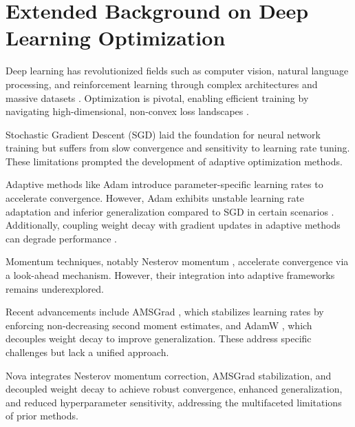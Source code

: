 \documentclass{article}
\begin{document}
\section{ Extended Background on Deep Learning Optimization}\label{Sec 1}

Deep learning has revolutionized fields such as computer vision, natural language processing, and reinforcement learning through complex architectures and massive datasets \cite{He2016, Vaswani2017}. Optimization is pivotal, enabling efficient training by navigating high-dimensional, non-convex loss landscapes \cite{Goodfellow2016}.

Stochastic Gradient Descent (SGD) \cite{Robbins1951} laid the foundation for neural network training but suffers from slow convergence and sensitivity to learning rate tuning. These limitations prompted the development of adaptive optimization methods.

Adaptive methods like Adam \cite{Kingma2014} introduce parameter-specific learning rates to accelerate convergence. However, Adam exhibits unstable learning rate adaptation and inferior generalization compared to SGD in certain scenarios \cite{Wilson2017, Loshchilov2017}. Additionally, coupling weight decay with gradient updates in adaptive methods can degrade performance \cite{Loshchilov2017}.

Momentum techniques, notably Nesterov momentum \cite{nesterov1983method}, accelerate convergence via a look-ahead mechanism. However, their integration into adaptive frameworks remains underexplored.

Recent advancements include AMSGrad \cite{Reddi2018}, which stabilizes learning rates by enforcing non-decreasing second moment estimates, and AdamW \cite{Loshchilov2017}, which decouples weight decay to improve generalization. These address specific challenges but lack a unified approach.

Nova integrates Nesterov momentum correction, AMSGrad stabilization, and decoupled weight decay to achieve robust convergence, enhanced generalization, and reduced hyperparameter sensitivity, addressing the multifaceted limitations of prior methods.



%
\end{document}
